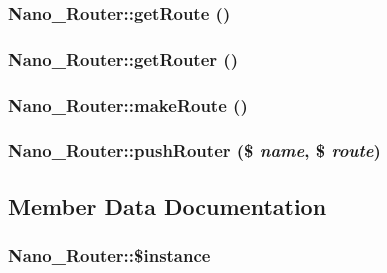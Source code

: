 \hypertarget{classNano__Router_15d331f41889a2c037af3afaad1d2e35}{
\subsubsection[{getRoute}]{\setlength{\rightskip}{0pt plus 5cm}Nano\_\-Router::getRoute ()}}
\label{classNano__Router_15d331f41889a2c037af3afaad1d2e35}


\hypertarget{classNano__Router_bc924b7f8f035cf8364169c30f432445}{
\subsubsection[{getRouter}]{\setlength{\rightskip}{0pt plus 5cm}Nano\_\-Router::getRouter ()}}
\label{classNano__Router_bc924b7f8f035cf8364169c30f432445}


\hypertarget{classNano__Router_04c74f9043f2c18e5c64abdd4bd91ccd}{
\subsubsection[{makeRoute}]{\setlength{\rightskip}{0pt plus 5cm}Nano\_\-Router::makeRoute ()}}
\label{classNano__Router_04c74f9043f2c18e5c64abdd4bd91ccd}


\hypertarget{classNano__Router_02f6f240771229cdf830c911d3c07390}{
\subsubsection[{pushRouter}]{\setlength{\rightskip}{0pt plus 5cm}Nano\_\-Router::pushRouter (\$ {\em name}, \/  \$ {\em route})}}
\label{classNano__Router_02f6f240771229cdf830c911d3c07390}




\subsection{Member Data Documentation}
\hypertarget{classNano__Router_788e9870173727a90258cf5d413e8088}{
\subsubsection[{\$instance}]{\setlength{\rightskip}{0pt plus 5cm}Nano\_\-Router::\$instance}}
\label{classNano__Router_788e9870173727a90258cf5d413e8088}


